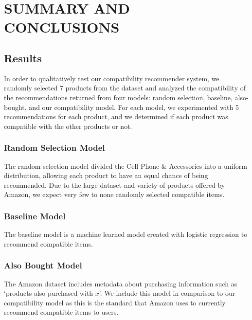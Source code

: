 %
%
%
%

\chapter{SUMMARY AND CONCLUSIONS \label{cha:Summary}}

\section{Results}
In order to qualitatively test our compatibility recommender system, we randomly selected 7 products from the dataset and analyzed the compatibility of the recommendations returned from four models: random selection, baseline, also-bought, and our compatibility model. For each model, we experimented with 5 recommendations for each product, and we determined if each product was compatible with the other products or not.


\subsection{Random Selection Model}
The random selection model divided the Cell Phone \& Accessories into a uniform distribution, allowing each product to have an equal chance of being recommended. Due to the large dataset and variety of products offered by Amazon, we expect very few to none randomly selected compatible items.

\subsection{Baseline Model}
The baseline model is a machine learned model created with logistic regression to recommend compatible items.

\subsection{Also Bought Model}
The Amazon dataset includes metadata about purchasing information such as `products also purchased with $x$'. We include this model in comparison to our compatibility model as this is the standard that Amazon uses to currently recommend compatible items to users.

